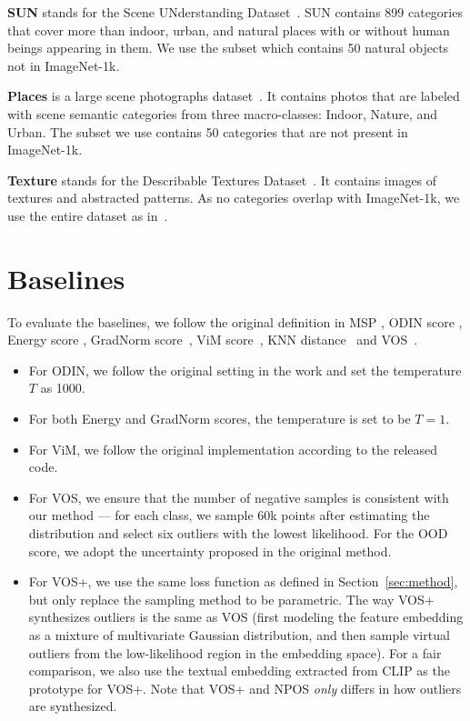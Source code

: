 \textbf{SUN} stands for the Scene UNderstanding Dataset~\citep{xiao2010sun}. SUN contains 899 categories that cover more than indoor, urban, and natural places with or without human beings appearing in them. We use the subset which contains 50 natural objects not in ImageNet-1k.

\textbf{Places} is a large scene photographs dataset~\citep{zhou2017places}. It contains photos that are labeled with scene semantic categories from three macro-classes: Indoor, Nature, and Urban. The subset we use contains 50 categories that are not present in ImageNet-1k.

\textbf{Texture} stands for the Describable Textures Dataset~\citep{cimpoi2014describing}. It contains images of textures and abstracted patterns. As no categories overlap with ImageNet-1k, we use the entire dataset as in~\cite{huang2021mos}.





\section{Baselines}
\label{sec:baseline_app}
To evaluate the baselines, we follow the original definition in  MSP \citep{hendrycks2016baseline, fort2021exploring}, ODIN score \citep{liang2018enhancing}, Energy score \citep{liu2020energy}, GradNorm score~\citep{huang2021importance}, ViM score~\citep{haoqi2022vim}, KNN distance~\citep{sun2022out} and VOS~\citep{du2022unknown}. 
\begin{itemize}
    \item For ODIN, we follow the original setting in the work and set 
the temperature $T$ as 1000. 
\item For both Energy and GradNorm scores, the temperature is set to be $T = 1$. 
\item For ViM, we follow the original implementation according to the released code. 
\item For VOS, we ensure that the number of negative samples is consistent with our method --- for each class, we sample $60$k points after estimating the distribution and select six outliers with the lowest likelihood. For the OOD score, we adopt the uncertainty proposed in the original method. 
\item For VOS+, we use the same loss function as defined in Section~\ref{sec:method}, but only replace the sampling method to be parametric. The way VOS+ synthesizes outliers is the same as VOS (first modeling the feature embedding as a mixture of multivariate Gaussian distribution, and then sample virtual outliers from the low-likelihood region in the embedding space). For a fair comparison, we also use the textual embedding extracted from CLIP as the prototype for VOS+. Note that VOS+ and NPOS \emph{only} differs in how outliers are synthesized. 
\end{itemize}





